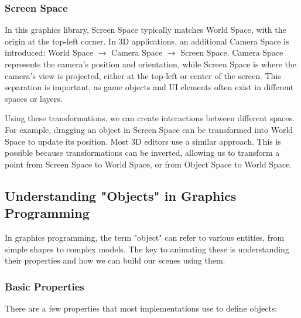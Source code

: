 \vspace{1cm}

\subsubsection{Screen Space}
\label{sec:screen-space}

In this graphics library, Screen Space typically matches World Space, with the origin at the top-left corner. In 3D applications, an additional Camera Space is introduced: World Space $\rightarrow$ Camera Space $\rightarrow$ Screen Space. Camera Space represents the camera's position and orientation, while Screen Space is where the camera's view is projected, either at the top-left or center of the screen. This separation is important, as game objects and UI elements often exist in different spaces or layers.

\begin{Note}
    Using these transformations, we can create interactions between different spaces. For example, dragging an object in Screen Space can be transformed into World Space to update its position. Most 3D editors use a similar approach. This is possible because transformations can be inverted, allowing us to transform a point from Screen Space to World Space, or from Object Space to World Space.
\end{Note}

\pagebreak

\subsection{Understanding "Objects" in Graphics Programming}
\label{sec:understanding-objects}

In graphics programming, the term "object" can refer to various entities, from simple shapes to complex models. The key to animating these is understanding their properties and how we can build our scenes using them.


\subsubsection{Basic Properties}

There are a few properties that most implementations use to define objects:

